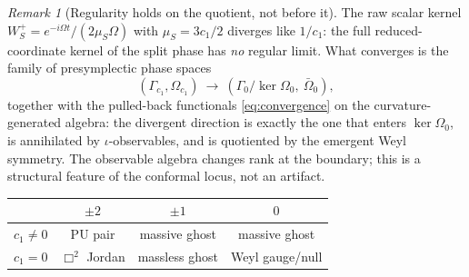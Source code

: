 \documentclass[11pt]{article}
\theoremstyle{definition}
\theoremstyle{remark}
\newtheorem{remark}[theorem]{Remark}
\begin{document}
\begin{remark}[Regularity holds on the quotient, not before it]
\label{rem:quotient}
The raw scalar kernel $W^+_S=e^{-i\Omega t}/(2\mu_S\Omega)$ with
$\mu_S=3c_1/2$ diverges like $1/c_1$: the full reduced-coordinate kernel
of the split phase has \emph{no} regular limit.  What converges is the
family of presymplectic phase spaces
\begin{equation}
(\Gamma_{c_1},\Omega_{c_1})\ \longrightarrow\
(\Gamma_0/\ker\Omega_0,\ \bar\Omega_0),
\end{equation}
together with the pulled-back functionals \eqref{eq:convergence} on the
curvature-generated algebra: the divergent direction is exactly the one
that enters $\ker\Omega_0$, is annihilated by $\iota$-observables, and is
quotiented by the emergent Weyl symmetry.  The observable algebra changes
rank at the boundary; this is a structural feature of the conformal
locus, not an artifact.
\end{remark}

\begin{center}
\begin{tabular}{c|c|c|c}
 & $\pm2$ & $\pm1$ & $0$\\
\hline
$c_1\neq0$ & PU pair & massive ghost & massive ghost\\
$c_1=0$ & $\Box^2$ Jordan & massless ghost & Weyl gauge/null
\end{tabular}
\end{center}
\end{document}
